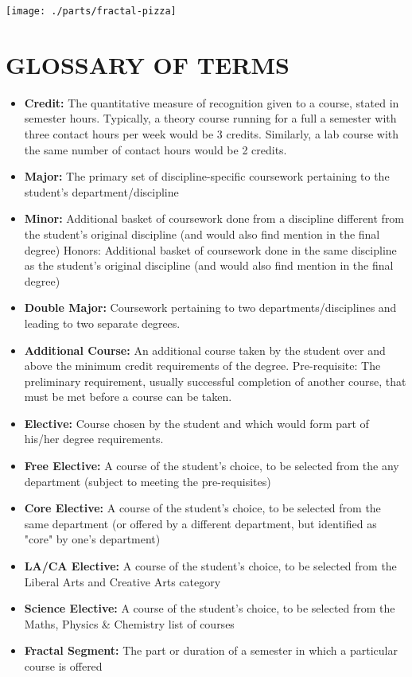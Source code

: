 
\begin{center}
\texttt{[image: ./parts/fractal-pizza]}
\end{center}

\section{GLOSSARY OF TERMS }
\begin{itemize}
\item {\bf Credit:} The quantitative measure of recognition given to a course, stated in semester hours. Typically, a theory course running for a full a semester with three contact hours per week would be 3 credits. Similarly, a lab course with the same number of contact hours would be 2 credits.  
\item {\bf Major:} The primary set of discipline-specific coursework pertaining to the student’s department/discipline  
\item {\bf Minor:} Additional basket of coursework done from a discipline different from the student’s original discipline (and would also find mention in the final degree)
Honors: Additional basket of coursework done in the same discipline as the student’s original discipline (and would also find mention in the final degree)
\item {\bf Double Major:} Coursework pertaining to two departments/disciplines and leading to two separate degrees.
\item {\bf Additional Course:} An additional course taken by the student over and above the minimum credit requirements of the degree. 
Pre-requisite: The preliminary requirement, usually successful completion of another course, that must be met before a course can be taken.
\item {\bf Elective:} Course chosen by the student and which would form part of his/her degree requirements. 
\item {\bf Free Elective:} A course of the student’s choice, to be selected from the any department (subject to meeting the pre-requisites) 
\item {\bf Core Elective:} A course of the student’s choice, to be selected from the same department (or offered by a different department, but identified as "core" by one's department)
\item {\bf LA/CA Elective:} A course of the student’s choice, to be selected from the Liberal Arts and Creative Arts category 
\item {\bf Science Elective:} A course of the student’s choice, to be selected from the Maths, Physics \& Chemistry list of courses
\item {\bf Fractal Segment:} The part or duration of a semester in which a particular course is offered
\end{itemize}

